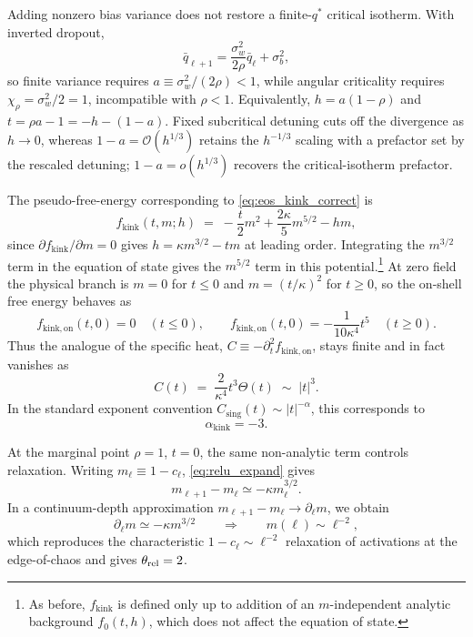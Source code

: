 Adding nonzero \relu{} bias variance does not restore a finite-\(q^*\) critical isotherm. With inverted dropout,
\begin{equation}
\bar q_{\ell+1}=\frac{\sigma_w^2}{2\rho}\bar q_\ell+\sigma_b^2,
\end{equation}
so finite variance requires \(a\equiv\sigma_w^2/(2\rho)<1\), while angular criticality requires \(\chi_\rho=\sigma_w^2/2=1\), incompatible with \(\rho<1\). Equivalently, \(h=a(1-\rho)\) and \(t=\rho a-1=-h-(1-a)\). Fixed subcritical detuning cuts off the divergence as \(h\to0\), whereas \(1-a=\mathcal O(h^{1/3})\) retains the \(h^{-1/3}\) scaling with a prefactor set by the rescaled detuning; \(1-a=o(h^{1/3})\) recovers the critical-isotherm prefactor.

The pseudo-free-energy corresponding to \eqref{eq:eos_kink_correct} is
\begin{equation}
f_{\mathrm{kink}}(t,m;h) \;=\; -\frac{t}{2} m^2 + \frac{2\kappa}{5} m^{5/2} - h m,
\label{eq:free_energy_kink}
\end{equation}
since $\partial f_{\mathrm{kink}}/\partial m=0$ gives $h=\kappa m^{3/2}-tm$ at leading order. Integrating the $m^{3/2}$ term in the equation of state gives the $m^{5/2}$ term in this potential.\footnote{
As before, $f_{\mathrm{kink}}$ is defined only up to addition of an $m$-independent analytic background $f_0(t,h)$, which does not affect the equation of state.
}
At zero field the physical branch is $m=0$ for $t\le 0$ and $m=(t/\kappa)^2$ for $t\ge 0$, so the on-shell free energy behaves as
\begin{equation}
f_{\mathrm{kink,on}}(t,0)=0 \quad (t\le 0), \qquad f_{\mathrm{kink,on}}(t,0)=-\frac{1}{10\kappa^{4}} t^{5}\quad (t\ge 0).
\end{equation}
Thus the analogue of the specific heat, $C\equiv-\partial_t^{2} f_{\mathrm{kink,on}}$, stays finite and in fact vanishes as
\begin{equation}
C(t)\;=\;\frac{2}{\kappa^{4}} t^{3} \Theta(t)\;\sim\;|t|^{3}.
\end{equation}
In the standard exponent convention $C_{\mathrm{sing}}(t)\sim |t|^{-\alpha}$, this corresponds to
\begin{equation}
\alpha_{\mathrm{kink}}=-3.
\end{equation}

At the marginal point \(\rho=1\), \(t=0\), the same non-analytic term controls relaxation. Writing \(m_\ell\equiv1-c_\ell\), \eqref{eq:relu_expand} gives
\begin{equation}
m_{\ell+1}-m_\ell \simeq -\kappa m_\ell^{3/2}.
\label{eq:kink_relax}
\end{equation}
In a continuum-depth approximation \(m_{\ell+1}-m_\ell\to \partial_\ell m\), we obtain
\begin{equation}
\partial_\ell m \simeq -\kappa m^{3/2} \qquad\Rightarrow\qquad m(\ell)\sim \ell^{-2},
\label{eq:kink_relax_sol}
\end{equation}
which reproduces the characteristic \(1-c_\ell\sim \ell^{-2}\) relaxation of \relu{} activations at the edge-of-chaos \cite{hayou2019impact} and gives \(\theta_{\rm rel}=2\).

